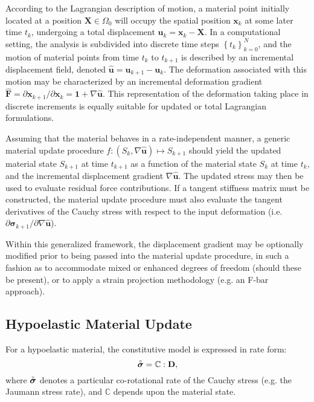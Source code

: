 According to the Lagrangian description of motion, a material point initially located at a position $\mathbf{X} \in \Omega_0$ will occupy the spatial position $\mathbf{x}_k$ at some later time $t_k$, undergoing a total displacement $\mathbf{u}_k = \mathbf{x}_k - \mathbf{X}$. In a computational setting, the analysis is subdivided into discrete time steps $\left\{ t_k \right\}_{k=0}^N$, and the motion of material points from time $t_k$ to $t_{k+1}$ is described by an incremental displacement field, denoted $\hat{\mathbf{u}} = \mathbf{u}_{k+1} - \mathbf{u}_{k}$. The deformation associated with this motion may be characterized by an incremental deformation gradient $\hat{\mathbf{F}} = \partial \mathbf{x}_{k+1} / \partial \mathbf{x}_k = \mathbf{1} + \nabla \hat{\mathbf{u}}$. This representation of the deformation taking place in discrete increments is equally suitable for updated or total Lagrangian formulations.

Assuming that the material behaves in a rate-independent manner, a generic material update procedure $f \colon (S_k, \nabla \hat{\mathbf{u}}) \mapsto S_{k+1}$ should yield the updated material state $S_{k+1}$ at time $t_{k+1}$ as a function of the material state $S_k$ at time $t_k$, and the incremental displacement gradient $\nabla \hat{\mathbf{u}}$. The updated stress may then be used to evaluate residual force contributions. If a tangent stiffness matrix must be constructed, the material update procedure must also evaluate the tangent derivatives of the Cauchy stress with respect to the input deformation (i.e. $\partial \boldsymbol{\sigma}_{k+1} / \partial \nabla \hat{\mathbf{u}}$).

Within this generalized framework, the displacement gradient may be optionally modified prior to being passed into the material update procedure, in such a fashion as to accommodate mixed or enhanced degrees of freedom (should these be present), or to apply a strain projection methodology (e.g. an F-bar approach).

\subsection{Hypoelastic Material Update}

For a hypoelastic material, the constitutive model is expressed in rate form:
\begin{equation}
        \accentset{\circ}{\boldsymbol{\sigma}} = \mathbb{C} : \mathbf{D},
\end{equation}
where $\accentset{\circ}{\boldsymbol{\sigma}}$ denotes a particular co-rotational rate of the Cauchy stress (e.g. the Jaumann stress rate), and $\mathbb{C}$ depends upon the material state.

